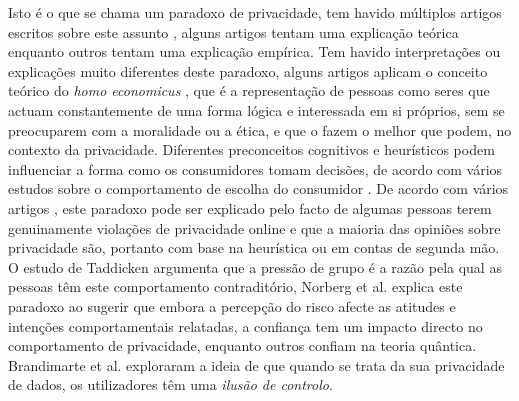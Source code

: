 \documentclass[conference]{IEEEtran}
\begin{document}

Isto é o que se chama um paradoxo de privacidade, tem havido múltiplos artigos
escritos sobre este assunto \cite{solove2021myth, WilliamsPrivacy, lee2021investigating, goad2021privacy, gerber2018explaining},
alguns artigos tentam uma explicação teórica enquanto outros tentam uma explicação
empírica. Tem havido interpretações ou explicações muito diferentes deste
paradoxo, alguns artigos \cite{wilson2012unpacking, warshaw2015can, lee2015privacy}
aplicam o conceito teórico do \textit{homo economicus} \cite{zak2008moral},
que é a representação de pessoas como seres que actuam constantemente de uma
forma lógica e interessada em si próprios, sem se preocuparem com a moralidade
ou a ética, e que o fazem o melhor que podem, no contexto da privacidade.
Diferentes preconceitos cognitivos e heurísticos podem influenciar a forma
como os consumidores tomam decisões, de acordo com vários estudos sobre o
comportamento de escolha do consumidor \cite{acquisti2007can, knijnenburg2013dimensionality, wakefield2013influence, flender2012type}.
De acordo com vários artigos \cite{dienlin2015privacy, baek2014solving}, este
paradoxo pode ser explicado pelo facto de algumas pessoas terem genuinamente
violações de privacidade online e que a maioria das opiniões sobre privacidade
são, portanto com base na heurística ou em contas de segunda mão. O estudo
de Taddicken \cite{taddicken2014privacy} argumenta que a pressão de grupo
é a razão pela qual as pessoas têm este comportamento contraditório, Norberg
et al. \cite{norberg2007privacy} explica este paradoxo ao sugerir que embora
a percepção do risco afecte as atitudes e intenções comportamentais relatadas,
a confiança tem um impacto directo no comportamento de privacidade, enquanto
outros \cite{flender2012type, kokolakis2017privacy} confiam na teoria quântica.
Brandimarte et al. \cite{brandimarte2013misplaced} exploraram a ideia de que
quando se trata da sua privacidade de dados, os utilizadores têm uma \textit{ilusão
de controlo}.
\end{document}
